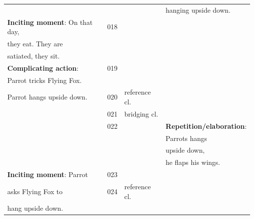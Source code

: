 \documentclass[output=paper]{LSP/langsci}
\begin{document}
{\begin{longtable}{llll}
                                              &                   &                 & hanging upside down.           \\                                     
\textbf{Inciting moment}: On that day,               & 018               &                 &                                              \\
they eat. They are                                      &                   &                 &                                              \\
satiated, they sit.                    &                   &                 &                                              \\
\textbf{Complicating action}:                         & 019               &                 &                                              \\
Parrot tricks Flying Fox.                      &                   &                 &                                              \\
Parrot hangs upside down.                            & 020               & reference cl.                &                                              \\
                                                 & 021               & bridging cl. &                                              \\
                                                 & 022          &                 & \textbf{Repetition/elaboration}:       \\
                                          &                   &                 & Parrots  hangs               \\
                                            &                   &                 & upside down,               \\                                        
                                                        &                   &                 & he flaps his wings.              \\                                                                      
\textbf{Inciting moment}: Parrot                    & 023          &                 &                                              \\
asks Flying Fox to                        &         024          &  reference cl.               &                                              \\
hang upside down.                         &                   &                 &                                              \\

\end{longtable}}
\end{document}
